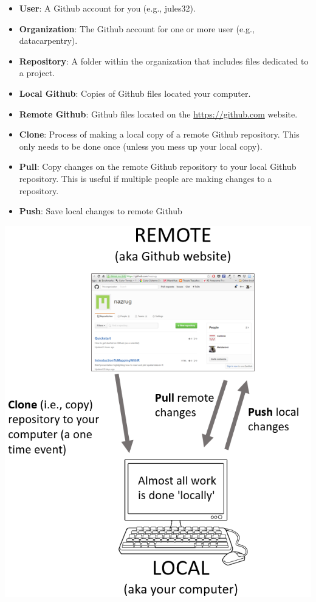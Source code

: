\documentclass[]{book}
\providecommand{\tightlist}{%
  \setlength{\itemsep}{0pt}\setlength{\parskip}{0pt}}
\theoremstyle{definition}
\theoremstyle{definition}
\theoremstyle{definition}
\theoremstyle{remark}
\begin{document}
\begin{itemize}
\tightlist
\item
  \textbf{User}: A Github account for you (e.g., jules32).
\item
  \textbf{Organization}: The Github account for one or more user (e.g.,
  datacarpentry).
\item
  \textbf{Repository}: A folder within the organization that includes
  files dedicated to a project.
\item
  \textbf{Local Github}: Copies of Github files located your computer.
\item
  \textbf{Remote Github}: Github files located on the
  \url{https://github.com} website.
\item
  \textbf{Clone}: Process of making a local copy of a remote Github
  repository. This only needs to be done once (unless you mess up your
  local copy).
\item
  \textbf{Pull}: Copy changes on the remote Github repository to your
  local Github repository. This is useful if multiple people are making
  changes to a repository.
\item
  \textbf{Push}: Save local changes to remote Github 
\end{itemize}

\includegraphics{img/push_pull_clone.png}
\end{document}
